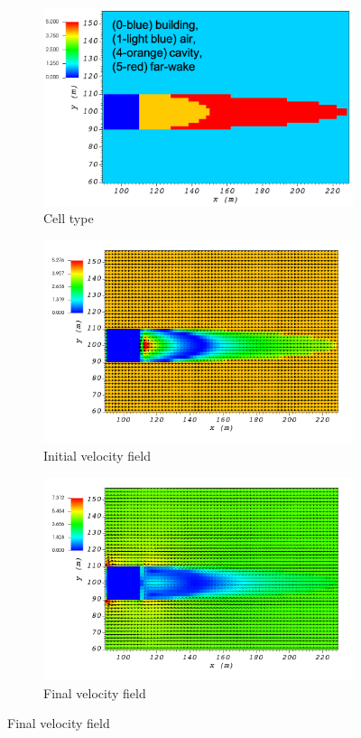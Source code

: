 \documentclass[14pt,landscape]{report}
\begin{document}
\begin{figure}[p]
    \centering
    \begin{subfigure}[t]{0.45\textwidth}
    \centering
    \includegraphics[width=10.3cm,keepaspectratio]{Images/wake_z_5_1_init_icell.png}
    \caption{Cell type}
    \end{subfigure}
    \begin{subfigure}[t]{0.45\textwidth}
    \centering
    \includegraphics[width=11.0cm,keepaspectratio]{Images/wake_z_5_1_init_vel.png}
    \caption{Initial velocity field}
    \end{subfigure}
    \begin{subfigure}[t]{0.45\textwidth}
    \centering
    \includegraphics[width=11.0cm,keepaspectratio]{Images/wake_z_5_1_final.png}
    \caption{Final velocity field}
    \end{subfigure}
\end{figure}
\end{document}
